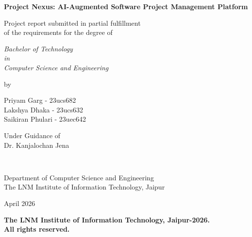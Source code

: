 \documentclass[a4paper, 11pt, oneside]{Dissertation}
\begin{document}
\sloppy
{}

\thispagestyle{empty}
\begin{center}
{\Large \bf Project Nexus: AI-Augmented Software Project Management Platform}

\vspace*{1.75cm}
{\large Project report submitted in partial fulfillment\\}
{\large of the requirements for the degree of \\}

\vspace*{1cm}
{\it {\large Bachelor of Technology} \\
{\large in\\}
{\large Computer Science and Engineering \\}}

\vspace*{1cm}
{\large by}

\vspace*{1cm}
{\large Priyam Garg - 23ucs682\\}
{\large Lakshya Dhaka - 23ucs632\\}
{\large Saikiran Phulari - 23uec642\\}

\vspace*{5mm}
{\large Under Guidance of \\}
{\large Dr. Kanjalochan Jena\\}

\vspace*{1.0cm}
{\\}

\vspace*{2.0cm}
{\large Department of Computer Science and Engineering \\}
{\large The LNM Institute of Information Technology, Jaipur\\}

\vspace*{1.0cm}
{\large April 2026\\}
\end{center}

\clearpage

\thispagestyle{empty}
\vfill
\begin{center}
\vspace*{\fill} \textcopyright \textbf{The LNM Institute of Information Technology, Jaipur-2026.}\\
\textbf{All rights reserved.}
\end{center}
\clearpage
\end{document}
